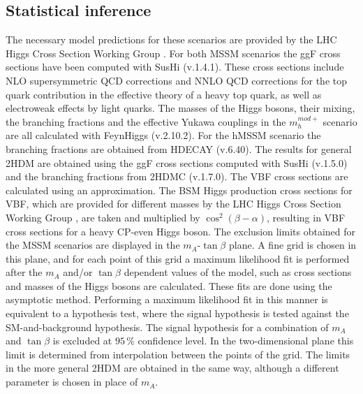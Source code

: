 \subsection*{Statistical inference}

The necessary model predictions for these scenarios are provided by the LHC Higgs Cross Section Working Group \cite{bsmhiggsxsecs}. For both MSSM scenarios the ggF cross sections have been computed with SusHi (v.1.4.1)\cite{Harlander:2012pb}. These cross sections include NLO supersymmetric QCD corrections and NNLO QCD corrections for the top quark contribution in the effective theory of a heavy top quark, as well as electroweak effects by light quarks. The masses of the Higgs bosons, their mixing, the branching fractions and the effective Yukawa couplings in the $m_{h}^{mod+}$ scenario are all calculated with FeynHiggs (v.2.10.2)\cite{Heinemeyer:1998yj, Heinemeyer:1998np, Degrassi:2002fi, Frank:2006yh, Hahn:2013ria}. For the hMSSM scenario the branching fractions are obtained from HDECAY (v.6.40)\cite{Djouadi:1997yw, Djouadi:2006bz}. The results for general 2HDM are obtained using the ggF cross sections computed with SusHi (v.1.5.0) and the branching fractions from 2HDMC (v.1.7.0)\cite{Rathsman:2011yv}. The VBF cross sections are calculated using an approximation. The BSM Higgs production cross sections for VBF, which are provided for different masses by the LHC Higgs Cross Section Working Group \cite{bsmhiggsxsecs2}, are taken and multiplied by $\cos^{2}(\beta-\alpha)$, resulting in VBF cross sections for a heavy CP-even Higgs boson.\newline
The exclusion limits obtained for the MSSM scenarios are displayed in the $m_{A}$-$\tan\beta$ plane. A fine grid is chosen in this plane, and for each point of this grid a maximum likelihood fit is performed after the $m_{A}$ and/or $\tan\beta$ dependent values of the model, such as cross sections and masses of the Higgs bosons are calculated. These fits are done using the asymptotic method. Performing a maximum likelihood fit in this manner is equivalent to a hypothesis test, where the signal hypothesis is tested against the SM-and-background hypothesis. The signal hypothesis for a combination of $m_{A}$ and $\tan\beta$ is excluded at $95\,\%$ confidence level. In the two-dimensional plane this limit is determined from interpolation between the points of the grid. The limits in the more general 2HDM are obtained in the same way, although a different parameter is chosen in place of $m_{A}$.

